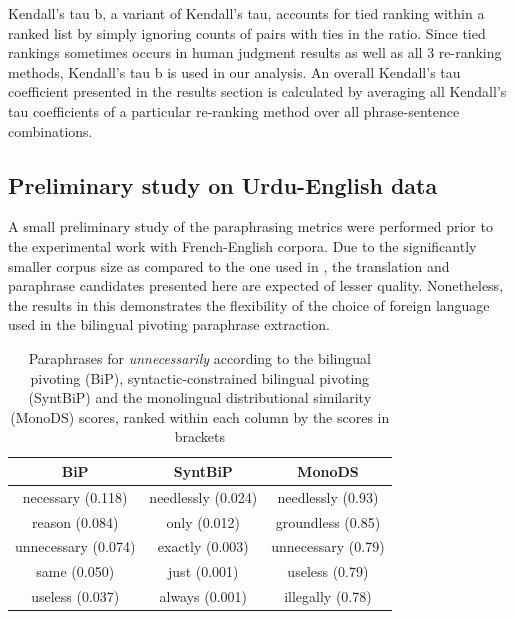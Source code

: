 \documentclass[11pt]{article}
\begin{document}
Kendall's tau b, a variant of Kendall's tau, accounts for tied ranking within a ranked list by simply ignoring counts of pairs with ties in the ratio. Since tied rankings sometimes occurs in human judgment results as well as all 3 re-ranking methods, Kendall's tau b is used in our analysis. An overall Kendall's tau coefficient presented in the results section is calculated by averaging all Kendall's tau coefficients of a particular re-ranking method over all phrase-sentence combinations.

\subsection{Preliminary study on Urdu-English data}
\label{sect:results_ur_en}

A small preliminary study of the paraphrasing metrics were performed prior to the experimental work with French-English corpora. Due to the significantly smaller corpus size as compared to the one used in , the translation and paraphrase candidates presented here are expected of lesser quality. Nonetheless, the results in this demonstrates the flexibility of the choice of foreign language used in the bilingual pivoting paraphrase extraction.

\begin{table}[h]
\begin{center}
\begin{tabular}{ccc}%
\hline\hline \bf \scriptsize BiP & \bf \scriptsize SyntBiP & \bf \scriptsize MonoDS \\ \hline
{\scriptsize necessary (0.118)} & {\scriptsize needlessly (0.024)} & {\scriptsize needlessly (0.93)} \\
{\scriptsize reason (0.084)} & {\scriptsize only (0.012)} & {\scriptsize groundless (0.85)} \\
{\scriptsize unnecessary (0.074)}& {\scriptsize exactly (0.003)}& {\scriptsize unnecessary (0.79)}\\
{\scriptsize same (0.050)} & {\scriptsize just (0.001)} & {\scriptsize useless (0.79)} \\
{\scriptsize useless (0.037)}& {\scriptsize always (0.001)}& {\scriptsize illegally (0.78)}\\
\hline
\end{tabular}
\end{center}
\caption{Paraphrases for {\em unnecessarily} according to the bilingual pivoting (BiP), syntactic-constrained bilingual pivoting (SyntBiP) and the monolingual distributional similarity (MonoDS) scores, ranked within each column by the scores in brackets}
\label{table1}
\end{table}
\end{document}
